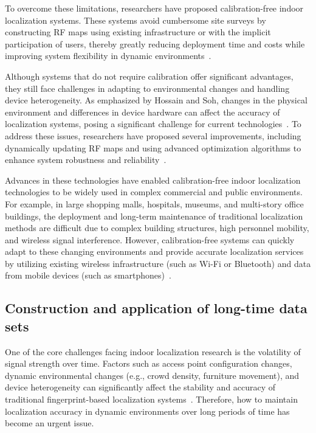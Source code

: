 \documentclass[12pt,a4paper]{article}
\numberwithin{equation}{section}
\begin{document}
To overcome these limitations, researchers have proposed calibration-free indoor
localization systems. These systems avoid cumbersome site surveys by
constructing RF maps using existing infrastructure or with the implicit
participation of users, thereby greatly reducing deployment time and costs while
improving system flexibility in dynamic
environments~\cite{HOSSAIN20151,li2018calibrationfree}.

Although systems that do not require calibration offer significant advantages,
they still face challenges in adapting to environmental changes and handling
device heterogeneity. As emphasized by Hossain and Soh, changes in the physical
environment and differences in device hardware can affect the accuracy of
localization systems, posing a significant challenge for current
technologies~\cite{HOSSAIN20151}. To address these issues, researchers have
proposed several improvements, including dynamically updating RF maps and using
advanced optimization algorithms to enhance system robustness and
reliability~\cite{zhang2020robust}.

Advances in these technologies have enabled calibration-free indoor localization
technologies to be widely used in complex commercial and public
environments. For example, in large shopping malls, hospitals, museums, and
multi-story office buildings, the deployment and long-term maintenance of
traditional localization methods are difficult due to complex building
structures, high personnel mobility, and wireless signal interference. However,
calibration-free systems can quickly adapt to these changing environments and
provide accurate localization services by utilizing existing wireless
infrastructure (such as Wi-Fi or Bluetooth) and data from mobile devices (such
as smartphones)~\cite{laoudias2018survey,xu2019wireless}.

\subsection{Construction and application of long-time data sets}
One of the core challenges facing indoor localization research is the volatility
of signal strength over time. Factors such as access point configuration
changes, dynamic environmental changes (e.g., crowd density, furniture
movement), and device heterogeneity can significantly affect the stability and
accuracy of traditional fingerprint-based localization
systems~\cite{liu2020survey}. Therefore, how to maintain localization accuracy
in dynamic environments over long periods of time has become an urgent issue.
\end{document}
